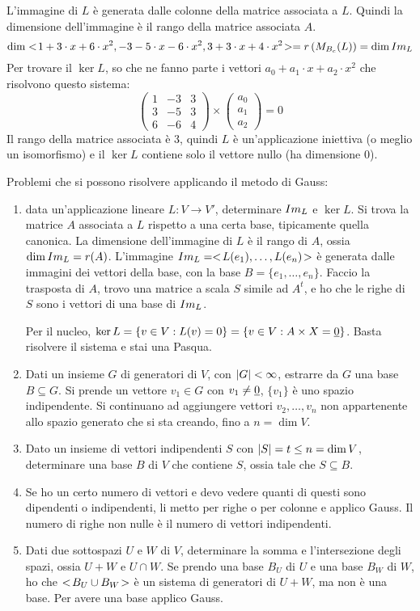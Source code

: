 \begin{exmp}
L'immagine di $L$ \`e generata dalle colonne della matrice associata a $L$. Quindi la dimensione dell'immagine \`e il rango della matrice associata $A$.
\[
\dim <\!{1 + 3 \cdot x + 6 \cdot x^2, -3 -5 \cdot x - 6 \cdot x^2, 3 + 3 \cdot x + 4 \cdot x^2}\!> =
r \left( M_{B_c} (L) \right) = \dim Im_{L}
\]
Per trovare il $\ker L$, so che ne fanno parte i vettori $a_0 + a_1 \cdot x + a_2 \cdot x^2$ che risolvono questo sistema:
\[
\begin{pmatrix}
1 & -3 & 3 \\
3 & -5 & 3 \\
6 & -6 & 4
\end{pmatrix}
\times
\begin{pmatrix}
a_0 \\ a_1 \\ a_2
\end{pmatrix}
= 0
\]
Il rango della matrice associata \`e 3, quindi $L$ \`e un'applicazione iniettiva (o meglio un isomorfismo) e il $\ker L$ contiene solo il vettore nullo (ha dimensione 0).
\end{exmp}

Problemi che si possono risolvere applicando il metodo di Gauss:
\begin{enumerate}
    \item data un'applicazione lineare $L : V \to V'$, determinare $Im_{L}$ e $\ker L$. Si trova la matrice $A$ associata a $L$ rispetto a una certa base, tipicamente quella canonica. La dimensione dell'immagine di $L$ \`e il rango di $A$, ossia $\dim Im_{L} = r(A)$. L'immagine $Im_{L} = <\!{ L(e_1), \ldots, L(e_n)}\!>$ \`e generata dalle immagini dei vettori della base, con la base $B = \{ e_1, \ldots, e_n \}$. Faccio la trasposta di $A$, trovo una matrice a scala $S$ simile ad $A^t$, e ho che le righe di $S$ sono i vettori di una base di $Im_{L}$.

    Per il nucleo, $\ker L = \{ v \in V : L(v) = 0 \} = \{ v \in V : A \times X = \underline{0} \}$. Basta risolvere il sistema e stai una Pasqua.
    \item Dati un insieme $G$ di generatori di $V$, con $\left\lvert{G}\right\rvert < \infty$, estrarre da $G$ una base $B \subseteq G$. Si prende un vettore $v_1 \in G$ con $v_1 \neq \underline{0}$, $\{v_1\}$ \`e uno spazio indipendente. Si continuano ad aggiungere vettori $v_2, \ldots, v_n$ non appartenente allo spazio generato che si sta creando, fino a $n = \dim V$.
    \item Dato un insieme di vettori indipendenti $S$ con $\left\lvert{S}\right\rvert = t \le n = \dim V$, determinare una base $B$ di $V$ che contiene $S$, ossia tale che $S \subseteq B$.
    \item Se ho un certo numero di vettori e devo vedere quanti di questi sono dipendenti o indipendenti, li metto per righe o per colonne e applico Gauss. Il numero di righe non nulle \`e il numero di vettori indipendenti.
    \item Dati due sottospazi $U$ e $W$ di $V$, determinare la somma e l'intersezione degli spazi, ossia $U + W$ e $U \cap W$. Se prendo una base $B_U$ di $U$ e una base $B_W$ di $W$, ho che $<\!{B_U \cup B_W}\!>$ \`e un sistema di generatori di $U + W$, ma non \`e una base. Per avere una base applico Gauss. 
\end{enumerate}

